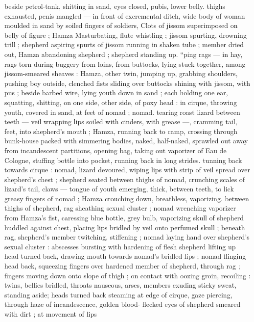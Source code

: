 beside petrol-tank, shitting in sand, eyes closed, pubis, lower belly. 
thighs exhausted, penis mangled --- in front of excremental ditch, 
wide body of woman moulded in sand by soiled fingers of soldiers, 
Clots of jissom superimposed on belly of figure ; Hamza 
Masturbating, flute whistling ; jissom spurting, drowning trill ; 
shepherd aspiring spurts of jissom running in shaken tube ; member 
dried out, Hamza abandoning shepherd ; shepherd standing up. 
“ping rags --- in hay, rags torn during buggery from loins, from 
buttocks, lying stuck together, among jissom-smeared sheaves : 
Hamza, other twin, jumping up, grabbing shoulders, pushing boy 
outside, clenched fists sliding over buttocks shining with jissom, with 
pus ; beside barbed wire, lying youth down in sand ; each holding 
one ear, squatting, shitting, on one side, other side, of poxy head : 
in cirque, throwing youth, covered in sand, at feet of nomad ; nomad. 
tearing roast lizard between teeth --- veil wrapping lips soiled with 
cinders, with grease ---, cramming tail, feet, into shepherd's mouth 
; Hamza, running back to camp, crossing through bunk-house packed 
with simmering bodies, naked, half-naked, sprawled out away from 
incandescent partitions, opening bag, taking out vaporizer of Eau de 
Cologne, stuffing bottle into pocket, running back in long strides. 
tunning back towards cirque : nomad, lizard devoured, wiping lips 
with strip of veil spread over shepherd's chest ; shepherd seated 
between thighs of nomad, crunching scales of lizard's tail, claws --- 
tongue of youth emerging, thick, between teeth, to lick greasy 
fingers of nomad ; Hamza crouching down, breathless, vaporizing. 
between thighs of shepherd, rag sheathing sexual cluster ; nomad 
wrenching vaporizer from Hamza's fist, caressing blue bottle, grey 
bulb, vaporizing skull of shepherd huddled against chest, placing 
lips bridled by veil onto perfumed skull ; beneath rag, shepherd's 
member twitching, stiffening ; nomad laying hand over shepherd's 
sexual cluster : abscesses bursting with hardening of flesh 
shepherd lifting up head turned back, drawing mouth towards 
nomad's bridled lips ; nomad flinging head back, squeezing fingers 
over hardened member of shepherd, through rag ; fingers moving 
down onto slope of thigh ; on contact with oozing groin, recoiling : 
twins, bellies bridled, throats nauseous, arses, members exuding 
sticky sweat, standing aside; heads turned back steaming at edge of 
cirque, gaze piercing, through haze of incandescence, golden blood- 
flecked eyes of shepherd smeared with dirt ; at movement of lips 

